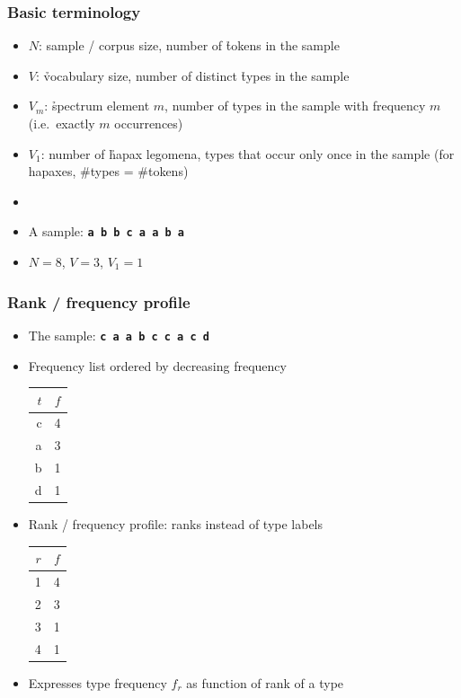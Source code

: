 \documentclass[t]{beamer} %
\begin{document}
\begin{frame}
 \frametitle{Basic terminology}

  \begin{itemize}
  \item $N$: sample / corpus size, number of \h{tokens} in the sample
  \item $V$: \h{vocabulary} size, number of distinct \h{types} in the sample
  \item $V_m$: \h{spectrum element} $m$, number of types in the sample with
    frequency $m$ (i.e.\ exactly $m$ occurrences)
  \item $V_1$: number of \h{hapax legomena}, types that occur only once in the
    sample (for hapaxes, \#types = \#tokens)
  \item[]
  \item A sample: \texttt{\textbf{a b b c a a b a}}
  \item $N = 8$, $V = 3$, $V_1 = 1$
  \end{itemize}
\end{frame}

\begin{frame}
\frametitle{Rank / frequency profile}

  \begin{itemize}
  \item The sample: \texttt{\textbf{c a a b c c a c d}}
  \item Frequency list ordered by decreasing frequency
    \begin{center}
      \begin{tabular}{r|r}
        $t$ & $f$\\
        \hline
        c & 4\\
        a & 3\\
        b & 1\\
        d & 1
      \end{tabular}
    \end{center}
    \pause
  \item Rank / frequency profile: ranks instead of type labels
    \begin{center}
      \begin{tabular}{r|r}
        $r$ & $f$\\
        \hline
        1 & 4\\
        2 & 3\\
        3 & 1\\
        4 & 1
      \end{tabular}
    \end{center}
  \item Expresses type frequency $f_r$ as function of rank of a type
  \end{itemize}

\end{frame}
\end{document}
